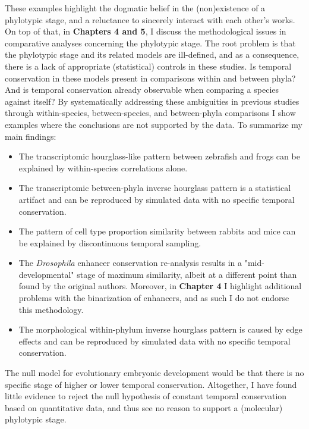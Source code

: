 These examples highlight the dogmatic belief in the (non)existence of a phylotypic stage, and a reluctance to sincerely interact with each other's works. On top of that, in \textbf{Chapters 4 and 5}, I discuss the methodological issues in comparative analyses concerning the phylotypic stage. The root problem is that the phylotypic stage and its related models are ill-defined, and as a consequence, there is a lack of appropriate (statistical) controls in these studies. Is temporal conservation in these models present in comparisons within and between phyla? And is temporal conservation already observable when comparing a species against itself? By systematically addressing these ambiguities in previous studies through within-species, between-species, and between-phyla comparisons I show examples where the conclusions are not supported by the data. To summarize my main findings:
\begin{itemize}
    \item The transcriptomic hourglass-like pattern between zebrafish and frogs\cite{marletaz2018} can be explained by within-species correlations alone.
    \item The transcriptomic between-phyla inverse hourglass pattern\cite{Levin2016} is a statistical artifact and can be reproduced by simulated data with no specific temporal conservation.
    \item The pattern of cell type proportion similarity between rabbits and mice\cite{Mayshar2023} can be explained by discontinuous temporal sampling.
    \item The \textit{Drosophila} enhancer conservation re-analysis results in a "mid-developmental" stage of maximum similarity, albeit at a different point than found by the original authors. Moreover, in \textbf{Chapter 4} I highlight additional problems with the binarization of enhancers, and as such I do not endorse this methodology.
    \item  The morphological within-phylum inverse hourglass pattern is caused by edge effects and can be reproduced by simulated data with no specific temporal conservation.
\end{itemize}
\noindent
The null model for evolutionary embryonic development would be that there is no specific stage of higher or lower temporal conservation. Altogether, I have found little evidence to reject the null hypothesis of constant temporal conservation based on quantitative data, and thus see no reason to support a (molecular) phylotypic stage.

